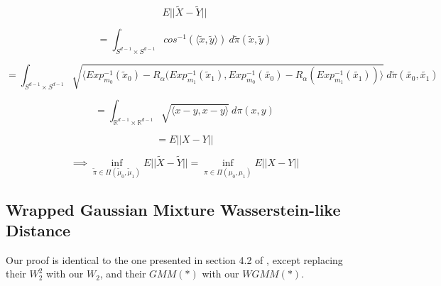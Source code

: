 \documentclass[]{article}
\begin{document}
\begin{equation*}
	E||\tilde{X}-\tilde{Y}||  
\end{equation*}  

\begin{equation*}
	= \int_{S^{d-1}\times S^{d-1}} cos^{-1}(\langle \tilde{x}, \tilde{y} \rangle) \ d\tilde{\pi}(\tilde{x},\tilde{y})
\end{equation*}

\begin{equation*}
	= \int_{S^{d-1}\times S^{d-1}} \sqrt{\langle Exp_{m_0}^{-1}(\tilde{x}_0) - R_\alpha(Exp_{m_1}^{-1}(\tilde{x}_1), Exp_{m_0}^{-1}(\tilde{x_0}) - R_\alpha(Exp_{m_1}^{-1}(\tilde{x_1})) \rangle} \ d\tilde{\pi}(\tilde{x_0},\tilde{x_1})
\end{equation*}


\begin{equation*}
	= \int_{\mathbb{R}^{d-1} \times \mathbb{R}^{d-1}} \sqrt{ \langle x - y, x-y\rangle} \ d\pi(x,y)
\end{equation*}

\begin{equation*}
	= E||{X}-{Y}||  
\end{equation*}  

\begin{equation}
	\implies \inf_{\tilde{\pi} \in \Pi(\tilde{\mu}_0, \tilde{\mu}_1)} E||\tilde{X}-\tilde{Y}||  = \inf_{\pi \in \Pi({\mu}_0, {\mu}_1)} E||X-Y||
\end{equation}  

\subsection{Wrapped Gaussian Mixture Wasserstein-like Distance}

Our proof is identical to the one presented in section 4.2 of \cite{https://doi.org/10.48550/arxiv.1907.05254}, except replacing their $W_2^2$ with our $W_2$, and their $GMM(*)$ with our $WGMM(*)$. 




\newpage



\cite{https://doi.org/10.48550/arxiv.1907.05254}
\cite{https://doi.org/10.48550/arxiv.0801.2250}
\cite{10.1307/mmj/1029003026}
\cite{COTFNT}
\cite{Ambrosio2013}
\end{document}
